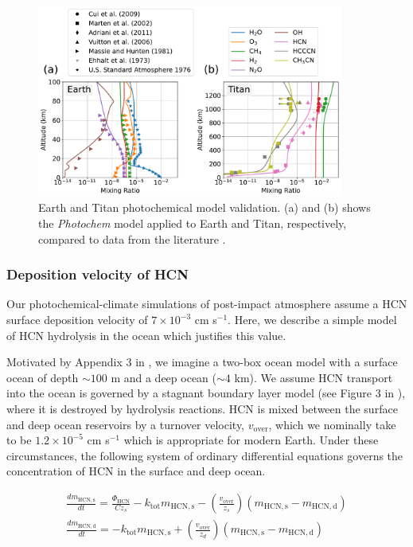 \begin{figure}
  \centering
  \includegraphics[width=0.9\textwidth]{tex/5impacts/figures/supplement/Earth_Titan_validation.pdf}
  \caption{Earth and Titan photochemical model validation. (a) and (b) shows the \emph{Photochem} model applied to Earth and Titan, respectively, compared to data from the literature \citep{Cui_2009,Marten_2002,Adriani_2011,Vuitton_2006,Massie_1981,Ehhalt_1975}.}
  \label{fig:earth_titan_valid}
\end{figure}

\subsubsection{Deposition velocity of HCN} \label{sec:hcn_vdep}

Our photochemical-climate simulations of post-impact atmosphere assume a HCN surface deposition velocity of $7 \times 10^{-3}$ cm s$^{-1}$. Here, we describe a simple model of HCN hydrolysis in the ocean which justifies this value.

Motivated by Appendix 3 in \citet{Kharecha_2005}, we imagine a two-box ocean model with a surface ocean of depth $\sim 100$ m and a deep ocean ($\sim 4$ km). We assume HCN transport into the ocean is governed by a stagnant boundary layer model (see Figure 3 in \citet{Kharecha_2005}), where it is destroyed by hydrolysis reactions. HCN is mixed between the surface and deep ocean reservoirs by a turnover velocity, $v_\text{over}$, which we nominally take to be $1.2 \times 10^{-5}$ cm s$^{-1}$ which is appropriate for modern Earth. Under these circumstances, the following system of ordinary differential equations governs the concentration of HCN in the surface and deep ocean.

\begin{gather}
  \frac{d m_\mathrm{HCN,s}}{dt} = \frac{\Phi_\mathrm{HCN}}{C z_s} - k_\mathrm{tot} m_\mathrm{HCN,s} - \left(\frac{v_\mathrm{over}}{z_s}\right)(m_\mathrm{HCN,s} - m_\mathrm{HCN,d}) \label{eq:hydro1}
  \\
  \frac{d m_\mathrm{HCN,d}}{dt} = - k_\mathrm{tot} m_\mathrm{HCN,s} + \left(\frac{v_\mathrm{over}}{z_d}\right)(m_\mathrm{HCN,s} - m_\mathrm{HCN,d}) \label{eq:hydro2}
\end{gather}

